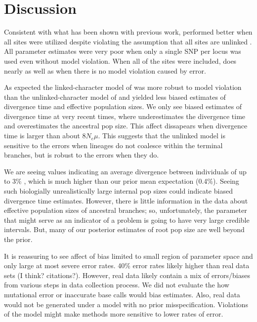 \section{Discussion}

Consistent with what has been shown with previous work, \ecoevolity performed 
better when all sites were utilized despite violating the assumption that all 
sites are unlinked \citep{Oaks2018ecoevolity}. All parameter estimates were very
poor when only a single SNP per locus was used even without model violation. 
When all of the sites were included, \ecoevolity does nearly as well as \beast 
when there is no model violation caused by error.

As expected the linked-character model of \beast was more robust to model 
violation than the unlinked-character model of \starbeast and yielded less biased 
estimates of divergence time and effective population sizes. 
We only see biased estimates of divergence time at very recent times, 
where \ecoevolity
underestimates the divergence time and overestimates the ancestral pop size.
This affect dissapears when divergence time is larger than about $8N_e\mu$.
This suggests that the unlinked model is sensitive to the errors
when lineages do not coalesce within the terminal branches,
but is robust to the errors when they do.

We are seeing values indicating an average divergence between individuals of up
to 3\% \rootfigs, which is much higher than our prior mean expectation (0.4\%).
Seeing such biologially unrealistically large internal pop sizes could indicate
biased divergence time estimates.
However, there is little information in the data about effective population sizes 
of ancestral branches; so, unfortunately, the parameter that might serve as an indicator
of a problem is going to have very large credible intervals.
But, many of our posterior estimates of root pop size are well beyond the
prior.

It is reassuring to see affect of bias limited to small region of parameter 
space and only large at most severe error rates.
40\% error rates likely higher than real data sets (I think? citations?).
However, real data likely contain a mix of errors/biases from
various steps in data collection process. We did not evaluate the how mutational
error or inaccurate base calls would bias estimates.
Also, real data would not be generated under a model with no prior misspecification.
Violations of the model might make methods more sensitive to lower rates of error.

